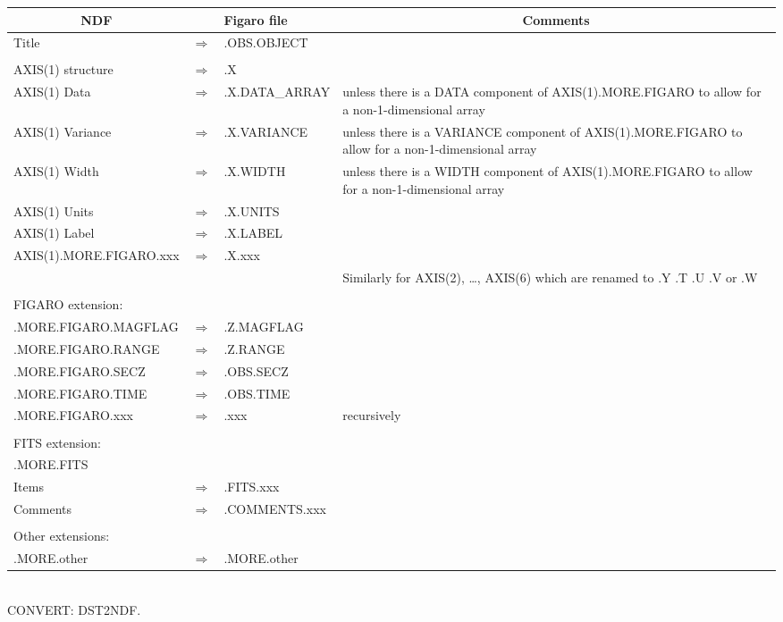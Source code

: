 \documentclass[twoside,11pt]{article}
\newcommand{\htmlref}[2]{#1}
\newcommand{\CONVERT}{{\footnotesize CONVERT}}
\newcommand{\sstdiytopic}[2]{\goodbreak \item[{\hspace{-0.35em}#1\hspace{-0.35em}:}] \mbox{} \\[1.3ex] #2}
\newcommand{\sstdiytopic}[2]{\\ \item[{#1}:]
      \begin{description}
         #2
      \end{description}
   }
\begin{document}
{{      \begin{center}
      \begin{tabular}{|lcl|p{54mm}|}
      \hline 
      \multicolumn{1}{|c}{NDF} & & Figaro file &
      \multicolumn{1}{|c|}{Comments} \\ \hline
      Title            & $\Rightarrow$ & .OBS.OBJECT & \\
      & & & \\
      AXIS(1) structure & $\Rightarrow$ & .X & \\
      AXIS(1) Data  & $\Rightarrow$ & .X.DATA\_ARRAY & unless there is a DATA
                          component of AXIS(1).MORE.FIGARO to allow for a 
                          non-1-dimensional array \\
      AXIS(1) Variance & $\Rightarrow$ & .X.VARIANCE & unless there is a
                          VARIANCE component of AXIS(1).MORE.FIGARO to
                          allow for a non-1-dimensional array \\
      AXIS(1) Width & $\Rightarrow$ & .X.WIDTH & unless there is a WIDTH
                          component of AXIS(1).MORE.FIGARO to
                          allow for a non-1-dimensional array \\
      AXIS(1) Units & $\Rightarrow$ & .X.UNITS & \\
      AXIS(1) Label & $\Rightarrow$ & .X.LABEL & \\
      AXIS(1).MORE.FIGARO.xxx & $\Rightarrow$ & .X.xxx & \\
      & & & Similarly for AXIS(2), \dots, AXIS(6) which are renamed to
           .Y .T .U .V or .W \\
      & & & \\
      FIGARO extension: & & & \\
      .MORE.FIGARO.MAGFLAG & $\Rightarrow$ & .Z.MAGFLAG & \\
      .MORE.FIGARO.RANGE & $\Rightarrow$ & .Z.RANGE & \\
      .MORE.FIGARO.SECZ & $\Rightarrow$ & .OBS.SECZ & \\
      .MORE.FIGARO.TIME & $\Rightarrow$ & .OBS.TIME & \\
      .MORE.FIGARO.xxx & $\Rightarrow$ & .xxx & recursively \\
      & & & \\
      FITS extension: & & & \\
      .MORE.FITS & & & \\
      Items  & $\Rightarrow$ & .FITS.xxx & \\
      Comments & $\Rightarrow$ & .COMMENTS.xxx & \\
      & & & \\
      Other extensions: & & & \\
      .MORE.other & $\Rightarrow$ & .MORE.other & \\ \hline
      \end{tabular}
      \end{center}
      \normalsize
   }
   \sstdiytopic{
      Related Applications
   }{
      \CONVERT: \htmlref{DST2NDF}{DST2NDF}.
   }
}
\end{document}
